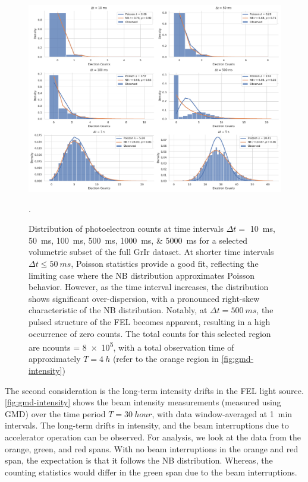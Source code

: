 \begin{figure}
    \centering
    \includegraphics[width=1\linewidth]{images/hist_counts_facetgrid_1_grir.pdf}
    \caption{Distribution of photoelectron counts at time intervals $\Delta t =$ \qtylist{10;50;100;500;1000;5000}{ms} for a selected volumetric subset of the full \gls{GrIr} dataset. At shorter time intervals $\Delta t \leq \qty{50}{ms}$, Poisson statistics provide a good fit, reflecting the limiting case where the \gls{NB} distribution approximates Poisson behavior. However, as the time interval increases, the distribution shows significant over-dispersion, with a pronounced right-skew characteristic of the \gls{NB} distribution. Notably, at $\Delta t = \qty{500}{ms}$, the pulsed structure of the \gls{FEL} becomes apparent, resulting in a high occurrence of zero counts. The total counts for this selected region are \gls{ncounts} = \num{8e5}, with a total observation time of approximately $T = \qty{4}{h}$ (refer to the orange region in \cref{fig:gmd-intensity})}.
    \label{fig:grir-stats-1}
\end{figure}


The second consideration is the long-term intensity drifts in the \gls{FEL} light source. \cref{fig:gmd-intensity} shows the beam intensity measurements (measured using \gls{GMD}) over the time period $T=\qty{30}{hour}$, with data window-averaged at \qty{1}{min} intervals. The long-term drifts in intensity, and the beam interruptions due to accelerator operation can be observed. For analysis, we look at the data from the orange, green, and red spans. With no beam interruptions in the orange and red span, the expectation is that it follows the \gls{NB} distribution. Whereas, the counting statistics would differ in the green span due to the beam interruptions.


